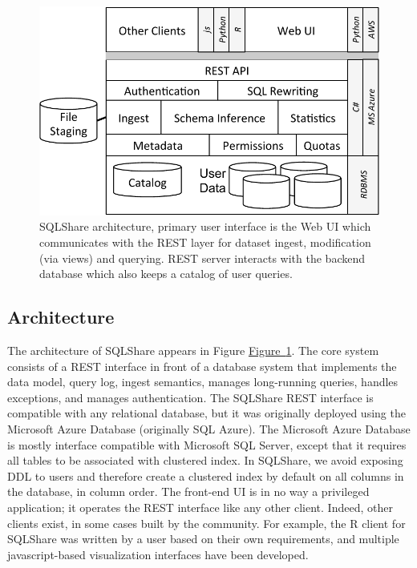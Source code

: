 \documentclass{sig-alternate}
\newcommand{\figref}[1]{\hyperref[#1]{Figure~\ref*{#1}}}
\newcommand{\sqlshare}{SQLShare}
\begin{document}
\begin{figure}[t]
\centering
\includegraphics[width=\linewidth]{architecture.pdf}
\caption{\sqlshare{} architecture, primary user interface is the Web UI which communicates with the REST layer for dataset ingest, modification (via views) and querying. REST server interacts with the backend database which also keeps a catalog of user queries.}
\label{fig:architecture}
\end{figure}

\subsection{Architecture}
The architecture of \sqlshare{} appears in Figure \figref{fig:architecture}. The core system consists of a REST interface in front of a database system that implements the data model, query log, ingest semantics, manages long-running queries, handles exceptions, and manages authentication. The \sqlshare{} REST interface is compatible with any relational database, but it was originally deployed using the Microsoft Azure Database (originally SQL Azure). The Microsoft Azure Database is mostly interface compatible with Microsoft SQL Server, except that it requires all tables to be associated with  clustered index.  In \sqlshare{}, we avoid exposing DDL to users and therefore create a clustered index by default on all columns in the database, in column order.   
The front-end UI is in no way a privileged application; it operates the REST interface like any other client.  Indeed, other clients exist, in some cases built by the community.  For example, the R client for \sqlshare{} was written by a user based on their own requirements, and multiple javascript-based visualization interfaces have been developed. 
\end{document}
